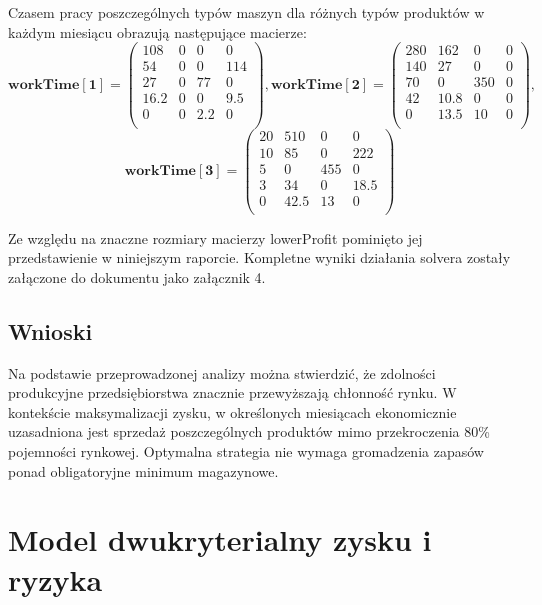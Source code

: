 \documentclass[11pt,a4paper]{article}
\begin{document}
Czasem pracy poszczególnych typów maszyn dla różnych typów produktów w każdym miesiącu obrazują następujące macierze:
\begin{displaymath}
 \mathbf{workTime[1]} =
 \begin{pmatrix}
  108 & 0 & 0 & 0 \\
  54 & 0 & 0 & 114 \\ 
  27 & 0 & 77 & 0 \\
  16.2 & 0 & 0 & 9.5 \\
  0 & 0 & 2.2 & 0 \\  
 \end{pmatrix},
 \mathbf{workTime[2]} =
 \begin{pmatrix}
  280 & 162 & 0 & 0 \\
  140 & 27 & 0 & 0 \\ 
  70 & 0 & 350 & 0 \\
  42 & 10.8 & 0 & 0 \\ 
  0 & 13.5 & 10 & 0 \\
 \end{pmatrix},
\end{displaymath}
\begin{displaymath}
 \mathbf{workTime[3]} =
 \begin{pmatrix}
  20 & 510 & 0 & 0 \\
  10 & 85 & 0 & 222 \\ 
  5 & 0 & 455 & 0 \\
  3 & 34 & 0 & 18.5 \\ 
  0 & 42.5 & 13 & 0 \\
 \end{pmatrix}
\end{displaymath}

Ze względu na znaczne rozmiary macierzy lowerProfit pominięto jej przedstawienie w niniejszym raporcie. Kompletne wyniki działania solvera zostały załączone do dokumentu jako załącznik 4.
\subsection{Wnioski}
Na podstawie przeprowadzonej analizy można stwierdzić, że zdolności produkcyjne przedsiębiorstwa znacznie przewyższają chłonność rynku. W kontekście maksymalizacji zysku, w określonych miesiącach ekonomicznie uzasadniona jest sprzedaż poszczególnych produktów mimo przekroczenia 80\% pojemności rynkowej. Optymalna strategia nie wymaga gromadzenia zapasów ponad obligatoryjne minimum magazynowe.

\section{Model dwukryterialny zysku i ryzyka}
\end{document}
